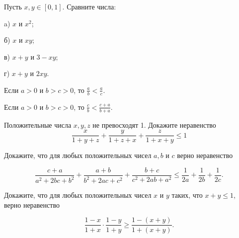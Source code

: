 Пусть $x, y \in[0,1]$. Сравните числа:

a) $x$ и $x^2$;

б) $x$ и $x y$;

в) $x+y$ и $3-x y$;

г) $x+y$ и $2 x y$.


Если $a>0$ и $b>c>0$, то $\frac{a}{b}<\frac{a}{c}$.

Если $a>0$ и $b>c>0$, то $\frac{c}{b}<\frac{c+a}{b+a}$.

Положительные числа $x, y, z$ не превосходят 1. Докажите неравенство 
$$\frac{x}{1+y+z}+\frac{y}{1+z+x}+\frac{z}{1+x+y} \leqslant 1$$

Докажите, что для любых положительных чисел $a, b$ и $c$ верно неравенство

$$
\frac{c+a}{a^2+2 b c+b^2}+\frac{a+b}{b^2+2 a c+c^2}+\frac{b+c}{c^2+2 a b+a^2} \leqslant \frac{1}{2 a}+\frac{1}{2 b}+\frac{1}{2 c} .
$$

Докажите, что для любых положительных чисел $x$ и $y$ таких, что $x+y \leqslant 1$, верно неравенство

$$
\frac{1-x}{1+x} \cdot \frac{1-y}{1+y} \geqslant \frac{1-(x+y)}{1+(x+y)} .
$$

